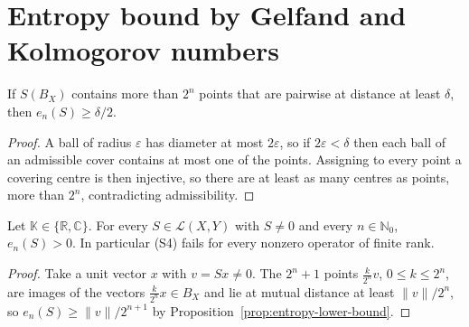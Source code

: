 \section{Entropy bound by Gelfand and Kolmogorov numbers}
\label{sec:entropy-sharp}

\begin{proposition}
\label{prop:entropy-lower-bound}
\leanok
{}
If $S(B_X)$ contains more than $2^n$ points that are pairwise at distance at
least $\delta$, then $e_n(S) \ge \delta / 2$.
\end{proposition}
\begin{proof}
\leanok
A ball of radius $\varepsilon$ has diameter at most $2\varepsilon$, so if
$2\varepsilon < \delta$ then each ball of an admissible cover contains at
most one of the points. Assigning to every point a covering centre is then
injective, so there are at least as many centres as points, more than
$2^n$, contradicting admissibility.
\end{proof}

\begin{theorem}
\label{thm:entropy-pos}
\leanok
{}
Let $\mathbb{K} \in \{\mathbb{R}, \mathbb{C}\}$. For every
$S \in \mathcal{L}(X, Y)$ with $S \neq 0$ and every $n \in \mathbb{N}_0$,
$e_n(S) > 0$. In particular (S4) fails for every nonzero operator of finite rank.
\end{theorem}
\begin{proof}
\leanok
{}
Take a unit vector $x$ with $v = Sx \neq 0$. The $2^n + 1$ points
$\frac{k}{2^n} v$, $0 \le k \le 2^n$, are images of the vectors
$\frac{k}{2^n} x \in B_X$ and lie at mutual distance at least $\|v\| / 2^n$, so
$e_n(S) \ge \|v\| / 2^{n+1}$ by Proposition~\ref{prop:entropy-lower-bound}.
\end{proof}


